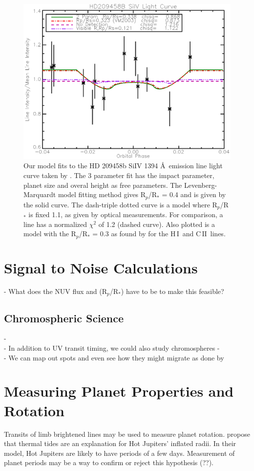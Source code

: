 \documentclass[manuscript]{aastex}
\newcommand{\cii}{\ensuremath{\mathrm{C}\,\scriptstyle \mathrm{II}}}
\newcommand{\hi}{\ensuremath{\mathrm{H}\,\scriptstyle \mathrm{I}}}
\begin{document}
\begin{figure}[!ht]
\includegraphics[width=0.9 \textwidth]{hd209458.eps}
\caption{Our model fits to the HD 209458b SiIV 1394 \AA\ emission line light curve taken by
  \citet{vidmad}. The 3 parameter fit has the impact parameter, planet
  size and overal height as free parameters. The Levenberg-Marquardt
  model fitting method gives R$_p$/R$_*$ = 0.4 and is given by the
  solid curve. The 
  dash-triple dotted curve is a model where R$_p$/R$_*$ is fixed 1.1,
  as given by optical measurements. For comparison, a line has a normalized
  $\chi^2$ of 1.2 (dashed curve). Also plotted is a model with the
  R$_p$/R$_*$ = 0.3 as found by \citet{vidmad} for the \hi\ and
  \cii\ lines.}
\label{fig03}
\end{figure}

\section{Signal to Noise Calculations} \label{labl:sn}
- What does the NUV flux and (R$_p$/R$_*$) have to be to make this feasible?

\subsection{Chromospheric Science} \label{labl:cscience}
- \\
- In addition to UV transit timing, we could also study chromospheres
- \\
- We can map out spots and even see how they might migrate as done by \citet{2010arXiv1002.4113H}

\section{Measuring Planet Properties and Rotation}
Transits of limb brightened lines may be used to measure planet rotation. \citet{socrates} propose that thermal tides are an explanation for Hot Jupiters' inflated radii. In their model, Hot Jupiters are likely to have periods of a few days. Measurement of planet periods may be a way to confirm or reject this hypothesis (??).
\end{document}
